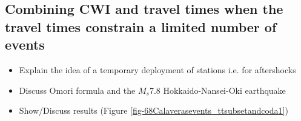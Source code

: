 \documentclass[extra]{gji}
\begin{document}


\subsection{Combining CWI and travel times when the travel times constrain a limited number of events}

\begin{itemize}
\item Explain the idea of a temporary deployment of stations i.e. for aftershocks
\item Discuss Omori formula and the $M_s$7.8 Hokkaido-Nansei-Oki earthquake
\citep[Figure \ref{fig:Omorifigure},]{dr_Utsu95a}
\item Show/Discuss results (Figure \ref{fig-68Calaverasevents_ttsubsetandcoda1})
\end{itemize}
\end{document}
